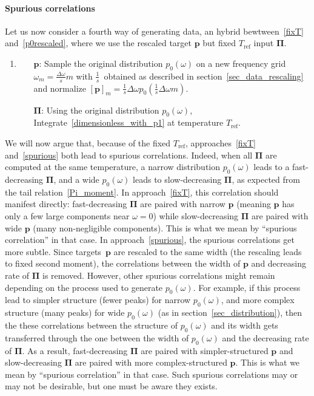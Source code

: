 \documentclass[notitlepage,11pt,nofootinbib]{revtex4-1}
\renewcommand{\vec}[1]{\bm{#1}}
\begin{document}
\paragraph*{Spurious correlations}
Let us now consider a fourth way of generating data, an hybrid bewtween~\ref{fixT} and~\ref{p0rescaled}, where we use the rescaled target $\vec p$ but fixed $T_{\text{ref}}$ input $\vec \Pi$.
\begin{enumerate}[resume]
    \item \label{spurious}
    \begin{itemize}
        \item[$\vec p$:] Sample the original distribution $p_0(\omega)$ on a new frequency grid $\omega_m=\frac{\Delta\omega}{s} m$ with $\frac{1}{s}$~obtained as described in section~\ref{sec_data_rescaling} and normalize $[\vec p]_m = \frac{1}{s}\Delta\omega p_0(\frac{1}{s}\Delta\omega m)$.

        \item[$\vec \Pi$:] Using the original distribution $p_0(\omega)$, Integrate~\eqref{dimensionless_with_p1} at temperature $T_{\text{ref}}$.
    \end{itemize}
\end{enumerate}

We will now argue that, because of the fixed $T_{\text{ref}}$, approaches~\ref{fixT} and~\ref{spurious} both lead to spurious correlations. Indeed, when all $\vec \Pi$ are computed at the same temperature, a narrow distribution $p_0(\omega)$ leads to a fast-decreasing $\vec \Pi$, and a wide $p_0(\omega)$ leads to slow-decreasing $\vec \Pi$, as expected from the tail relation~\eqref{Pi_moment}.
In approach~\ref{fixT}, this correlation should manifest directly: fast-decreasing $\vec \Pi$ are paired with narrow $\vec p$ (meaning $\vec p$ has only a few large components near $\omega=0$) while slow-decreasing $\vec \Pi$ are paired with wide $\vec p$ (many non-negligible components). This is what we mean by ``spurious correlation'' in that case.
In approach~\ref{spurious}, the spurious correlations get more subtle. Since targets~$\vec p$ are rescaled to the same width (the rescaling leads to fixed second moment), the correlations between the width of $\vec p$ and decreasing rate of $\vec \Pi$ is removed. However, other spurious correlations might remain depending on the process used to generate $p_0(\omega)$. For example, if this process lead to simpler structure (fewer peaks) for narrow $p_0(\omega)$, and more complex structure (many peaks) for wide $p_0(\omega)$ (as in section~\ref{sec_distribution}), then the these correlations between the structure of $p_0(\omega)$ and its width gets transferred through the one between the width of $p_0(\omega)$ and the decreasing rate of $\vec \Pi$. As a result, fast-decreasing $\vec \Pi$ are paired with simpler-structured $\vec p$ and slow-decreasing $\vec \Pi$ are paired with more complex-structured $\vec p$. This is what we mean by ``spurious correlation'' in that case.
Such spurious correlations may or may not be desirable, but one must be aware they exists.
\end{document}
